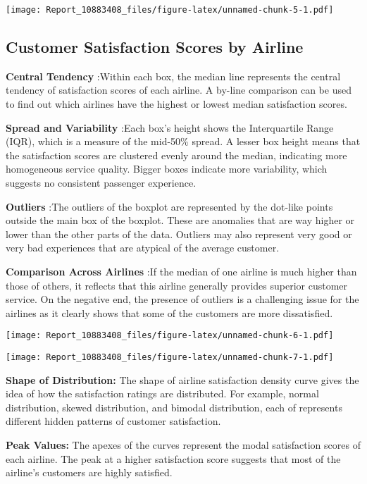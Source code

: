 \documentclass[
]{article}
\begin{document}
\texttt{[image: Report\_10883408\_files/figure-latex/unnamed-chunk-5-1.pdf]}

\subsection{Customer Satisfaction Scores by
Airline}\label{customer-satisfaction-scores-by-airline}

\textbf{Central Tendency} :Within each box, the median line represents
the central tendency of satisfaction scores of each airline. A by-line
comparison can be used to find out which airlines have the highest or
lowest median satisfaction scores.

\textbf{Spread and Variability} :Each box's height shows the
Interquartile Range (IQR), which is a measure of the mid-50\% spread. A
lesser box height means that the satisfaction scores are clustered
evenly around the median, indicating more homogeneous service quality.
Bigger boxes indicate more variability, which suggests no consistent
passenger experience.

\textbf{Outliers} :The outliers of the boxplot are represented by the
dot-like points outside the main box of the boxplot. These are anomalies
that are way higher or lower than the other parts of the data. Outliers
may also represent very good or very bad experiences that are atypical
of the average customer.

\textbf{Comparison Across Airlines} :If the median of one airline is
much higher than those of others, it reflects that this airline
generally provides superior customer service. On the negative end, the
presence of outliers is a challenging issue for the airlines as it
clearly shows that some of the customers are more dissatisfied.

\texttt{[image: Report\_10883408\_files/figure-latex/unnamed-chunk-6-1.pdf]}

\texttt{[image: Report\_10883408\_files/figure-latex/unnamed-chunk-7-1.pdf]}

\textbf{Shape of Distribution:} The shape of airline satisfaction
density curve gives the idea of how the satisfaction ratings are
distributed. For example, normal distribution, skewed distribution, and
bimodal distribution, each of represents different hidden patterns of
customer satisfaction.

\textbf{Peak Values:} The apexes of the curves represent the modal
satisfaction scores of each airline. The peak at a higher satisfaction
score suggests that most of the airline's customers are highly
satisfied.
\end{document}
